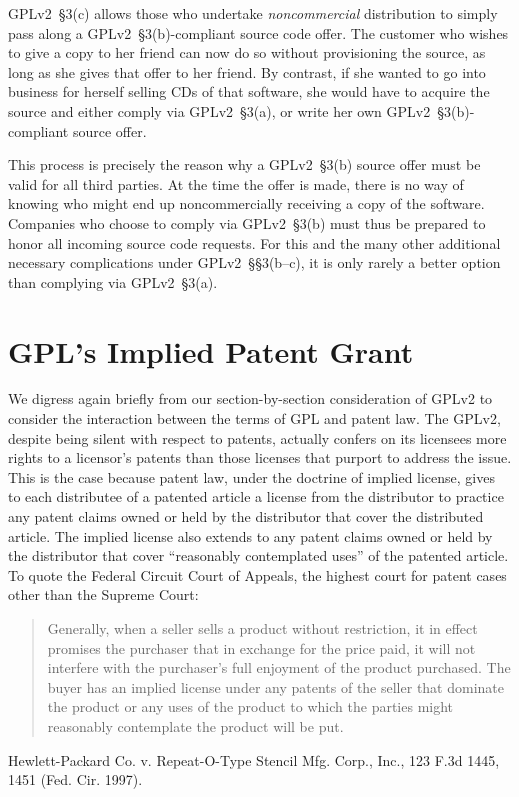 GPLv2~\S3(c) allows those who undertake \emph{noncommercial} distribution to
simply pass along a GPLv2~\S3(b)-compliant source code offer.  The customer who
wishes to give a copy to her friend can now do so without provisioning the
source, as long as she gives that offer to her friend.  By contrast, if
she wanted to go into business for herself selling CDs of that software,
she would have to acquire the source and either comply via GPLv2~\S3(a), or
write her own GPLv2~\S3(b)-compliant source offer.

This process is precisely the reason why a GPLv2~\S3(b) source offer must be
valid for all third parties.  At the time the offer is made, there is no
way of knowing who might end up noncommercially receiving a copy of the
software.  Companies who choose to comply via GPLv2~\S3(b) must thus be
prepared to honor all incoming source code requests.  For this and the
many other additional necessary complications under GPLv2~\S\S3(b--c), it is
only rarely a better option than complying via GPLv2~\S3(a).

\chapter{GPL's Implied Patent Grant}
\label{gpl-implied-patent-grant}

We digress again briefly from our section-by-section consideration of GPLv2
to consider the interaction between the terms of GPL and patent law. The
GPLv2, despite being silent with respect to patents, actually confers on its
licensees more rights to a licensor's patents than those licenses that
purport to address the issue. This is the case because patent law, under
the doctrine of implied license, gives to each distributee of a patented
article a license from the distributor to practice any patent claims owned
or held by the distributor that cover the distributed article. The
implied license also extends to any patent claims owned or held by the
distributor that cover ``reasonably contemplated uses'' of the patented
article. To quote the Federal Circuit Court of Appeals, the highest court
for patent cases other than the Supreme Court:

\begin{quotation}
Generally, when a seller sells a product without restriction, it in
effect promises the purchaser that in exchange for the price paid, it will
not interfere with the purchaser's full enjoyment of the product
purchased. The buyer has an implied license under any patents of the
seller that dominate the product or any uses of the product to which the
parties might reasonably contemplate the product will be put.
\end{quotation}
Hewlett-Packard Co. v. Repeat-O-Type Stencil Mfg. Corp., Inc., 123 F.3d
1445, 1451 (Fed. Cir. 1997).

